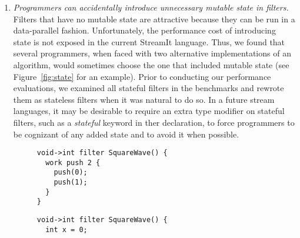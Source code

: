 \begin{enumerate}
\begin{figure}[t]
\centering
{}

\caption[A communication pattern unsuitable for structured streams.]{A
  communication pattern unsuitable for structured streams.  This
  pattern can arise in video compression, where each block informs its
  neighbors of its motion prediction before the next processing
  step.\protect\label{fig:inadequate}}.
\end{figure}

  Finally, there are rare cases in which the structured primitives in
  StreamIt have been inadequate for representing a streaming
  communication pattern.  Figure~\ref{fig:inadequate} illustrates an
  example from video compression, where each parallel filter performs
  a motion prediction for a fixed area of the screen.  Between
  successive frames, each filters shares its prediction with its
  neighbors on either side.  While this could be represented with a
  feedback loop around the entire computation, there would be
  complicated interleaving involved.  This case reflects a broader
  shortcoming, discussed below, that StreamIt is not designed for
  multidimensional data processing.

\item {\it Programmers can accidentally introduce unnecessary mutable
  state in filters.}  Filters that have no mutable state are
  attractive because they can be run in a data-parallel fashion.
  Unfortunately, the performance cost of introducing state is not
  exposed in the current StreamIt language.  Thus, we found that
  several programmers, when faced with two alternative implementations
  of an algorithm, would sometimes choose the one that included
  mutable state (see Figure~\ref{fig:state} for an example).  Prior to
  conducting our performance evaluations, we examined all stateful
  filters in the benchmarks and rewrote them as stateless filters when
  it was natural to do so.  In a future stream languages, it may be
  desirable to require an extra type modifier on stateful filters,
  such as a {\it stateful} keyword in ther declaration, to force
  programmers to be cognizant of any added state and to avoid it when
  possible.

\begin{figure}[t]
\hspace{0.1\textwidth}
\begin{minipage}{0.35\textwidth}
\centering
\ninepoint
\begin{verbatim}
void->int filter SquareWave() {
  work push 2 {
    push(0);
    push(1);
  }
}
\end{verbatim}
\end{minipage}
\hspace{0.1\textwidth}
\begin{minipage}{0.35\textwidth}
\centering
\ninepoint
\begin{verbatim}
void->int filter SquareWave() {
  int x = 0;
 

\end{verbatim}
\end{minipage}
\end{figure}
\end{enumerate}
